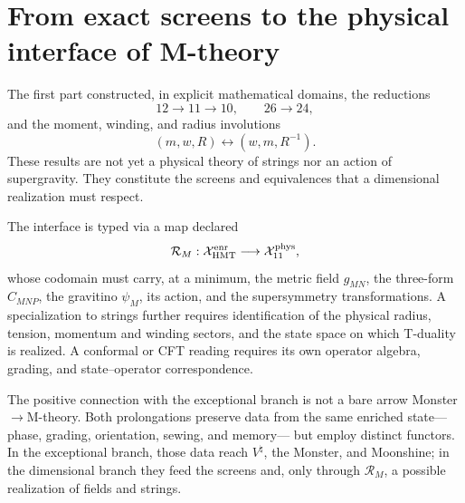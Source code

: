 \section{From exact screens to the physical interface of M-theory}
\label{mdp4:sec:interfaz-teoria-m-rev8}

The first part constructed, in explicit mathematical domains, the reductions
\[
12\longrightarrow11\longrightarrow10,
\qquad
26\longrightarrow24,
\]
and the moment, winding, and radius involutions
\[
(m,w,R)\longleftrightarrow(w,m,R^{-1}).
\]
These results are not yet a physical theory of strings nor an action
of supergravity. They constitute the screens and equivalences that a
dimensional realization must respect.

The interface is typed via a map declared
\[
\mathcal R_M:\mathcal X_{\rm HMT}^{\rm enr}
\longrightarrow
\mathcal X_{11}^{\rm phys},
\]
whose codomain must carry, at a minimum, the metric field \(g_{MN}\), the three-form \(C_{MNP}\), the gravitino \(\psi_M\), its action, and the supersymmetry transformations. A specialization to strings further requires identification of the physical radius, tension, momentum and winding sectors, and the state space on which T-duality is realized. A conformal or CFT reading requires its own operator algebra, grading, and state--operator correspondence.

The positive connection with the exceptional branch is not a bare arrow
Monster\(\to\)M-theory. Both prolongations preserve data from the same
enriched state---phase, grading, orientation, sewing, and memory---
but employ distinct functors. In the exceptional branch, those data reach
\(V^\natural\), the Monster, and Moonshine; in the dimensional branch they feed
the screens and, only through \(\mathcal R_M\), a possible realization of
fields and strings.

